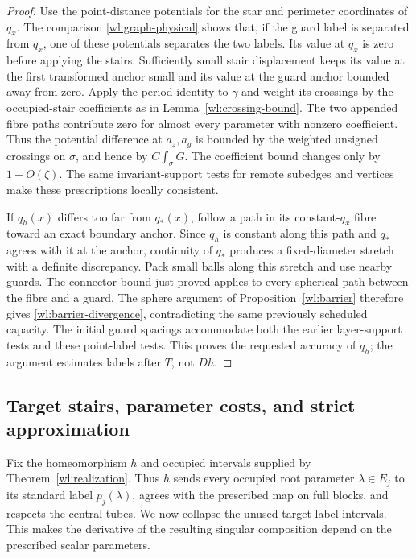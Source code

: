 \documentclass[11pt]{article}
\numberwithin{equation}{section}
\theoremstyle{definition}
\theoremstyle{remark}
\begin{document}
\begin{proof}
Use the point-distance potentials for the star and perimeter
coordinates of $q_x$.  The comparison
\eqref{wl:graph-physical} shows that, if the guard label is separated
from $q_x$, one of these potentials separates the two labels.
Its value at $q_x$ is zero before applying the stairs.  Sufficiently
small stair displacement keeps its value at the first transformed
anchor small and its value at the guard anchor bounded away from
zero.  Apply the period identity to $\gamma$ and weight its crossings by
the occupied-stair coefficients as in
Lemma~\ref{wl:crossing-bound}.  The two appended fibre paths contribute
zero for almost every parameter with nonzero coefficient.  Thus the
potential difference at $a_z,a_g$ is bounded by the weighted unsigned
crossings on $\sigma$, and hence by $C\int_\sigma G$.
The coefficient bound changes only by $1+O(\zeta)$.
The same invariant-support tests for remote subedges and vertices
make these prescriptions locally consistent.

If $q_h(x)$ differs too far from $q_*(x)$, follow a path in its
constant-$q_x$ fibre toward an exact boundary anchor.  Since $q_h$
is constant along this path and
$q_*$ agrees with it at the anchor, continuity of $q_*$ produces a
fixed-diameter stretch with a definite discrepancy.  Pack small
balls along this stretch and use nearby guards.  The connector
bound just proved applies to every spherical path between the fibre
and a guard.  The sphere argument of Proposition~\ref{wl:barrier}
therefore gives \eqref{wl:barrier-divergence}, contradicting the same
previously scheduled capacity.  The initial guard spacings accommodate
both the earlier layer-support tests and these point-label tests.
This proves the requested accuracy of $q_h$; the argument estimates
labels after $T$, not $Dh$.
\end{proof}

\subsection{Target stairs, parameter costs, and strict approximation}

Fix the homeomorphism $h$ and occupied intervals supplied by
Theorem~\ref{wl:realization}.  Thus $h$ sends every occupied root
parameter $\lambda\in E_j$ to its standard label $p_j(\lambda)$,
agrees with the prescribed map on full blocks, and respects the
central tubes.  We now collapse the unused target label intervals.
This makes the derivative of the resulting singular composition
depend on the prescribed scalar parameters.
\end{document}
